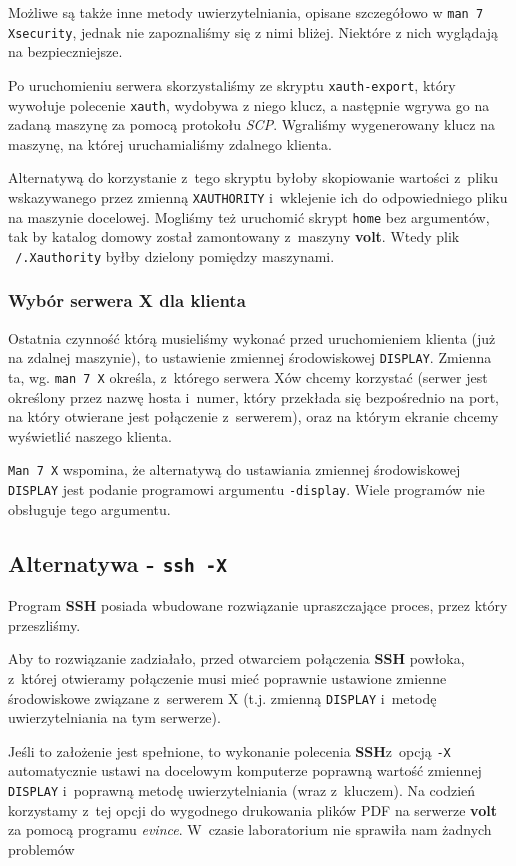 \documentclass[a4paper]{article}
\newcommand{\ssh}{\textbf{SSH}}
\newcommand{\volt}{\textbf{volt}}
\begin{document}
Możliwe są także inne metody uwierzytelniania, opisane szczegółowo w \texttt{man 7 Xsecurity}, jednak nie zapoznaliśmy się z nimi bliżej.
Niektóre z nich wyglądają na bezpieczniejsze.

Po uruchomieniu serwera skorzystaliśmy ze skryptu \texttt{xauth-export}, który wywołuje polecenie \texttt{xauth}, wydobywa z niego klucz, a następnie wgrywa go na zadaną maszynę za pomocą protokołu \emph{SCP}.
Wgraliśmy wygenerowany klucz na maszynę, na której uruchamialiśmy zdalnego klienta.

Alternatywą do korzystanie z~tego skryptu byłoby skopiowanie wartości z~pliku wskazywanego przez zmienną \texttt{XAUTHORITY} i~wklejenie ich do odpowiedniego pliku na maszynie docelowej.
Mogliśmy też uruchomić skrypt \texttt{home} bez argumentów, tak by katalog domowy został zamontowany z~maszyny \volt. Wtedy plik \texttt{~/.Xauthority} byłby dzielony pomiędzy maszynami.

\subsubsection{Wybór serwera X dla klienta}

Ostatnia czynność którą musieliśmy wykonać przed uruchomieniem klienta (już na zdalnej maszynie), to ustawienie zmiennej środowiskowej \texttt{DISPLAY}.
Zmienna ta, wg. \texttt{man 7 X} określa, z~którego serwera Xów chcemy korzystać (serwer jest określony przez nazwę hosta i~numer, który przekłada się bezpośrednio na port, na który otwierane jest połączenie z~serwerem), oraz na którym ekranie chcemy wyświetlić naszego klienta.

\texttt{Man 7 X} wspomina, że alternatywą do ustawiania zmiennej środowiskowej \texttt{DISPLAY} jest podanie programowi argumentu \texttt{-display}.
Wiele programów nie obsługuje tego argumentu.

\subsection{Alternatywa - \texttt{ssh -X}}
Program \ssh{} posiada wbudowane rozwiązanie upraszczające proces, przez który przeszliśmy.

Aby to rozwiązanie zadziałało, przed otwarciem połączenia \ssh{} powłoka, z~której otwieramy połączenie musi mieć poprawnie ustawione zmienne środowiskowe związane z~serwerem X
(t.j. zmienną \texttt{DISPLAY} i~metodę uwierzytelniania na tym serwerze).

Jeśli to założenie jest spełnione, to wykonanie polecenia \ssh z~opcją \texttt{-X} automatycznie ustawi na docelowym komputerze poprawną wartość zmiennej \texttt{DISPLAY} i~poprawną metodę uwierzytelniania (wraz z~kluczem).
Na codzień korzystamy z~tej opcji do wygodnego drukowania plików PDF na serwerze \volt{} za pomocą programu \emph{evince}.
W~czasie laboratorium nie sprawiła nam żadnych problemów
\end{document}
